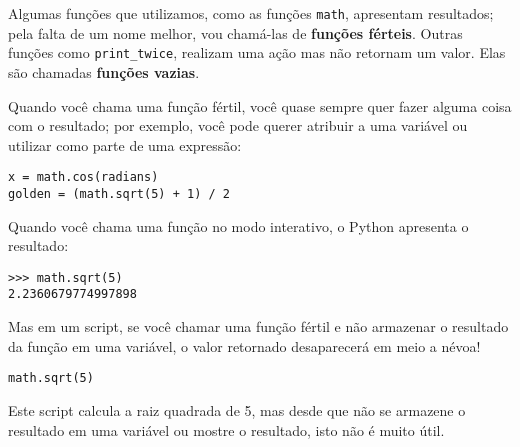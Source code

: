 
Algumas funções que utilizamos, como as funções {\tt math}, apresentam
resultados; pela falta de um nome melhor, vou chamá-las de
{\bf funções férteis}. Outras funções como \verb"print_twice", realizam
uma ação mas não retornam um valor. Elas são chamadas {\bf funções vazias}.


Quando você chama uma função fértil, você quase sempre quer fazer alguma
coisa com o resultado; por exemplo, você pode querer atribuir a uma variável
ou utilizar como parte de uma expressão:

\beforeverb
\begin{verbatim}
x = math.cos(radians)
golden = (math.sqrt(5) + 1) / 2
\end{verbatim}
\afterverb
%

Quando você chama uma função no modo interativo, o Python apresenta o resultado:

\beforeverb
\begin{verbatim}
>>> math.sqrt(5)
2.2360679774997898
\end{verbatim}
\afterverb
%

Mas em um script, se você chamar uma função fértil e não armazenar o
resultado da função em uma variável, o valor retornado desaparecerá
em meio a névoa!

\beforeverb
\begin{verbatim}
math.sqrt(5)
\end{verbatim}
\afterverb
%

Este script calcula a raiz quadrada de 5, mas desde que não se armazene o
resultado em uma variável ou mostre o resultado, isto não é muito útil.


